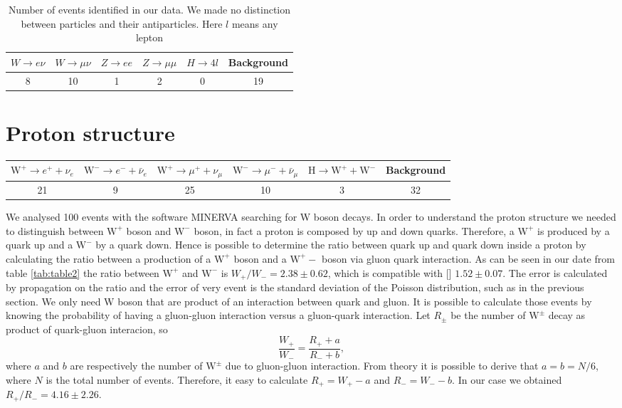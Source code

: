 \documentclass[%
 reprint,
 amsmath,amssymb,
 aps,
]{revtex4-1}
\begin{document}
\begin{table}[h]
\begin{ruledtabular}
\begin{tabular}{cccccc}
 $W\to e\nu$ & $W\to \mu\nu$ & $Z\to ee$ & $Z\to \mu\mu$ & $H\to 4l$ & Background \\
\hline
8 & 10 & 1 & 2 & 0 & 19
\end{tabular}
\end{ruledtabular}
\caption{\label{tab:table1}Number of events identified in our data. We made no distinction between particles and their antiparticles. Here $l$ means any lepton}
\end{table}

\section{Proton structure}

\begin{table*}
\begin{ruledtabular}
\begin{tabular}{cccccc}
 $\text{W}^+\to e^+ + \nu_e$ & $\text{W}^-\to e^- + \bar{\nu}_e$ & $\text{W}^+\to \mu^+ + \nu_\mu$ & $\text{W}^-\to \mu^- + \bar{\nu}_\mu$ & $\text{H}\to \text{W}^++\text{W}^-  $& Background \\
\hline
21 & 9 & 25 & 10 & 3 & 32
\end{tabular}
\end{ruledtabular}
\caption{\label{tab:table2}Number of events identified in our data}
\end{table*}
We analysed 100 events with the software MINERVA searching for W boson decays. In order to understand the proton structure we needed to distinguish between $\text{W}^+$ boson and $\text{W}^-$ boson, in fact a proton is composed by up and down quarks. Therefore, a $\text{W}^+$ is produced by a quark up and a $\text{W}^-$ by a quark down. Hence is possible to determine the ratio between quark up and quark down inside a proton by calculating the ratio between a production of a $\text{W}^+$ boson and a $\text{W}^+-$ boson via gluon quark interaction. As can be seen in our date from table \ref{tab:table2} the ratio between $\text{W}^+$ and $\text{W}^-$ is $W_+/W_- = 2.38 \pm 0.62$, which is compatible with [] $1.52 \pm 0.07$. The error is calculated by propagation on the ratio and the error of very event is the standard deviation of the Poisson distribution, such as in the previous section. We only need W boson that are product of an interaction between quark and gluon. It is possible to calculate those events by knowing the probability of having a gluon-gluon interaction versus a gluon-quark interaction. Let $R_{\pm}$ be the number of $\text{W}^\pm$ decay as product of quark-gluon interacion, so
\[\frac{W_+}{W_-} = \frac{R_+ + a}{R_- + b},\]
where $a$ and $b$ are respectively the number of $\text{W}^\pm$ due to gluon-gluon interaction. From theory it is possible to derive that $a = b = N/6$, where $N$ is the total number of events. Therefore, it easy to calculate $R_+ = W_+ -a$ and $R_- = W_- -b$. In our case we obtained $R_+/R_- = 4.16 \pm 2.26$.
\end{document}
